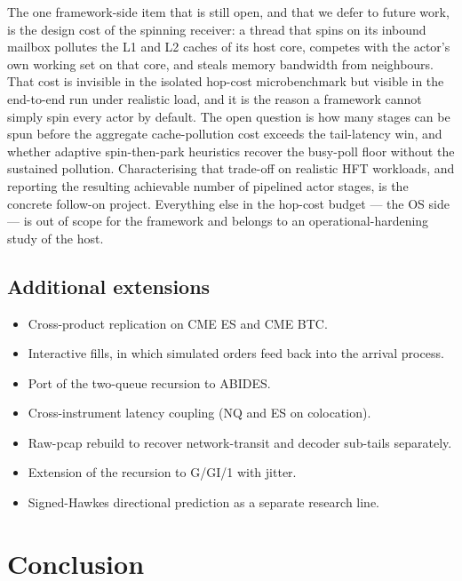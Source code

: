\documentclass[11pt]{article}
\begin{document}
The one framework-side item that is still open, and that we defer to future work, is the design cost of the spinning receiver: a thread that spins on its inbound mailbox pollutes the L1 and L2 caches of its host core, competes with the actor's own working set on that core, and steals memory bandwidth from neighbours. That cost is invisible in the isolated hop-cost microbenchmark but visible in the end-to-end run under realistic load, and it is the reason a framework cannot simply spin every actor by default. The open question is how many stages can be spun before the aggregate cache-pollution cost exceeds the tail-latency win, and whether adaptive spin-then-park heuristics recover the busy-poll floor without the sustained pollution. Characterising that trade-off on realistic HFT workloads, and reporting the resulting achievable number of pipelined actor stages, is the concrete follow-on project. Everything else in the hop-cost budget --- the OS side --- is out of scope for the framework and belongs to an operational-hardening study of the host.

\subsection{Additional extensions}
\label{sec:future-additional}

\begin{itemize}
    \item Cross-product replication on CME ES and CME BTC.
    \item Interactive fills, in which simulated orders feed back into the arrival process.
    \item Port of the two-queue recursion to ABIDES.
    \item Cross-instrument latency coupling (NQ and ES on colocation).
    \item Raw-pcap rebuild to recover network-transit and decoder sub-tails separately.
    \item Extension of the recursion to G/GI/1 with jitter.
    \item Signed-Hawkes directional prediction as a separate research line.
\end{itemize}

\section{Conclusion}
\label{sec:conclusion}
\end{document}
